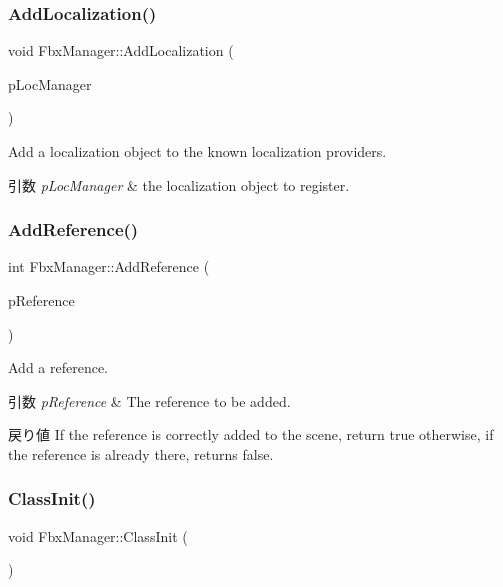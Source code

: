 \subsubsection{\texorpdfstring{Add\+Localization()}{AddLocalization()}}
{\footnotesize\ttfamily void Fbx\+Manager\+::\+Add\+Localization (\begin{DoxyParamCaption}\item[{Fbx\+Localization\+Manager $\ast$}]{p\+Loc\+Manager }\end{DoxyParamCaption})}

Add a localization object to the known localization providers. 
\begin{DoxyParams}{引数}
{\em p\+Loc\+Manager} & the localization object to register. \\
\hline
\end{DoxyParams}
\mbox{\label{class_fbx_manager_a955d69c7508979a9faec8d370a13cb8f}} 
\subsubsection{\texorpdfstring{Add\+Reference()}{AddReference()}}
{\footnotesize\ttfamily int Fbx\+Manager\+::\+Add\+Reference (\begin{DoxyParamCaption}\item[{\hyperlink{class_fbx_scene_reference}{Fbx\+Scene\+Reference} $\ast$}]{p\+Reference }\end{DoxyParamCaption})}

Add a reference. 
\begin{DoxyParams}{引数}
{\em p\+Reference} & The reference to be added. \\
\hline
\end{DoxyParams}
\begin{DoxyReturn}{戻り値}
If the reference is correctly added to the scene, return {\ttfamily true} otherwise, if the reference is already there, returns {\ttfamily false}. 
\end{DoxyReturn}
\mbox{\label{class_fbx_manager_a76c35582c17ecbba6745a9a9a7ed8c95}} 
\subsubsection{\texorpdfstring{Class\+Init()}{ClassInit()}}
{\footnotesize\ttfamily void Fbx\+Manager\+::\+Class\+Init (\begin{DoxyParamCaption}{ }\end{DoxyParamCaption})\hspace{0.3cm}{\ttfamily [protected]}}

